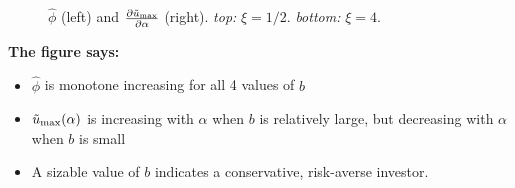 \documentclass{beamer}
\begin{document}
\begin{frame}
\begin{minipage}[t]{0.5\linewidth}
\begin{figure}[htb!]
\begin{minipage}{0.5\linewidth}
      \end{minipage}
      \caption{$\hat\phi$ (left) and
        ${\partial \tilde u_{\rm max} \over \partial \alpha}$ (right).
        {\em top:} $\xi = 1/2$. {\em bottom:} $\xi = 4$.
      }
      \label{fig:htfg}
    \end{figure}
  \end{minipage}\hfill
  \begin{minipage}[t]{0.5\linewidth}
    \textcolor[HTML]{990033}{\bf The figure says:}
    \begin{itemize}
    \item  $\hat\phi$ is monotone increasing for all 4 values of $b$
    \item $\tilde u_{\rm max}(\alpha)$ is increasing with $\alpha$
      when $b$ is relatively large, but  decreasing with $\alpha$ when
      $b$ is small
    \item A sizable value of $b$ indicates a conservative, risk-averse investor.
    \end{itemize}
  \end{minipage}
\end{frame}
\end{document}
